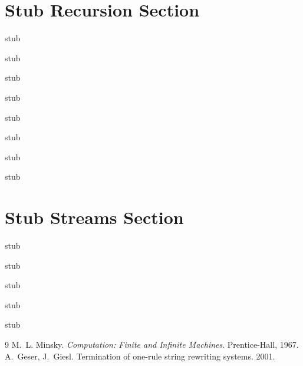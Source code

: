 \documentclass[runningheads,envcountsect]{llncs}
\renewenvironment{remark}
  {\rmfamily\trivlist\item[\hskip\labelsep{\itshape Remark.}]\ignorespaces}
  {\endtrivlist}
\begin{document}
\section{Stub Recursion Section}
\label{sec:recursion}
\begin{theorem}\label{thm:eager}stub\end{theorem}
\begin{theorem}\label{thm:lazyargs}stub\end{theorem}
\begin{proposition}\label{prop:lpcons}stub\end{proposition}
\begin{definition}\label{def:gate}stub\end{definition}
\begin{theorem}\label{thm:gate}stub\end{theorem}
\begin{remark}\label{rem:ifgate}stub\end{remark}
\begin{theorem}\label{thm:universal}stub\end{theorem}
\begin{corollary}\label{cor:barriers}stub\end{corollary}

\section{Stub Streams Section}
\label{sec:rec-streams}
\begin{theorem}\label{thm:subsequential}stub\end{theorem}
\begin{proposition}\label{prop:streamadeq}stub\end{proposition}
\begin{theorem}\label{thm:guardedness}stub\end{theorem}
\begin{remark}\label{rem:leastfix}stub\end{remark}
\begin{theorem}\label{thm:beyondfinite}stub\end{theorem}





\begin{thebibliography}{9}
 M.~L. Minsky. \emph{Computation: Finite and Infinite
Machines}. Prentice-Hall, 1967.
 A.~Geser, J.~Giesl. Termination of one-rule
string rewriting systems. 2001.
\end{thebibliography}
\end{document}
